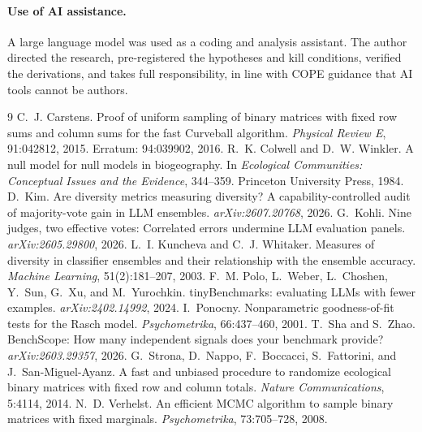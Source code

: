 \documentclass[10pt,letterpaper]{article}
\begin{document}
\paragraph{Use of AI assistance.} A large language model was used as a coding and analysis
assistant. The author directed the research, pre-registered the hypotheses and kill conditions,
verified the derivations, and takes full responsibility, in line with COPE guidance that AI tools
cannot be authors.

\small

\begin{thebibliography}{9}
 C.~J. Carstens. Proof of uniform sampling of binary matrices with fixed row sums and column sums for the fast Curveball algorithm. \emph{Physical Review E}, 91:042812, 2015. Erratum: 94:039902, 2016.
 R.~K. Colwell and D.~W. Winkler. A null model for null models in biogeography. In \emph{Ecological Communities: Conceptual Issues and the Evidence}, 344--359. Princeton University Press, 1984.
 D.~Kim. Are diversity metrics measuring diversity? A capability-controlled audit of majority-vote gain in LLM ensembles. \emph{arXiv:2607.20768}, 2026.
 G.~Kohli. Nine judges, two effective votes: Correlated errors undermine LLM evaluation panels. \emph{arXiv:2605.29800}, 2026.
 L.~I. Kuncheva and C.~J. Whitaker. Measures of diversity in classifier ensembles and their relationship with the ensemble accuracy. \emph{Machine Learning}, 51(2):181--207, 2003.
 F.~M. Polo, L.~Weber, L.~Choshen, Y.~Sun, G.~Xu, and M.~Yurochkin. tinyBenchmarks: evaluating LLMs with fewer examples. \emph{arXiv:2402.14992}, 2024.
 I.~Ponocny. Nonparametric goodness-of-fit tests for the Rasch model. \emph{Psychometrika}, 66:437--460, 2001.
 T.~Sha and S.~Zhao. BenchScope: How many independent signals does your benchmark provide? \emph{arXiv:2603.29357}, 2026.
 G.~Strona, D.~Nappo, F.~Boccacci, S.~Fattorini, and J.~San-Miguel-Ayanz. A fast and unbiased procedure to randomize ecological binary matrices with fixed row and column totals. \emph{Nature Communications}, 5:4114, 2014.
 N.~D. Verhelst. An efficient MCMC algorithm to sample binary matrices with fixed marginals. \emph{Psychometrika}, 73:705--728, 2008.
\end{thebibliography}
\end{document}

